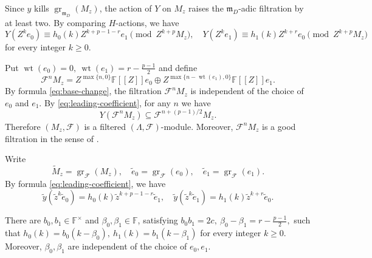 \documentclass[11pt,a4paper]{article} %
\def\FF{\mathbb{F}}
\def\cF{\mathcal{F}}
\def\gr{\operatorname{gr}}
\def\max{\operatorname{max}}
\def\wet{\operatorname{wt}}
\begin{document}
Since $y$ kills $\gr_{\mathfrak{m}_D}(M_z)$, the action of $Y$ on $M_z$ raises the $\mathfrak{m}_D$-adic filtration by at least two. By comparing $H$-actions, we have
\begin{equation}\label{eq:leading-coefficient}
Y(Z^ke_0)\equiv h_0(k)Z^{k+p-1-r}e_1\pmod{Z^{k+p}M_z},\quad Y(Z^ke_1)\equiv h_1(k)Z^{k+r}e_0\pmod{Z^{k+p}M_z}
\end{equation}
for every integer $k\ge0$.

Put $\wet(e_0)=0,~\wet(e_1)=r-\frac{p-1}{2}$ and define
\[
 \cF^nM_z=Z^{\max\{n,0\}}\FF[[Z]]e_0\oplus Z^{\max\{n-\wet(e_1),0\}}\FF[[Z]]e_1.
\]
By formula \eqref{eq:base-change}, the filtration $\cF^nM_z$ is independent of the choice of $e_0$ and $e_1$. By \eqref{eq:leading-coefficient}, for any $n$ we have
\[
Y(\cF^nM_z)\subseteq\cF^{n+(p-1)/2}M_z.
\]
Therefore $(M_z,\cF)$ is a filtered $(\Lambda,\cF)$-module. Moreover, $\cF^nM_z$ is a good filtration in the sense of \cite[\S I.5]{LvO96}.

Write 
\[
\widetilde{M}_z=\gr_{\cF}(M_z),\quad\widetilde{e}_0=\gr_{\cF}(e_0),\quad\widetilde{e}_1=\gr_{\cF}(e_1).
\]
By formula \eqref{eq:leading-coefficient}, we have
\[
\widetilde{y}(\widetilde{z}^k\widetilde{e}_0)=h_0(k)\widetilde{z}^{k+p-1-r}\widetilde{e}_1,\quad\widetilde{y}(\widetilde{z}^k\widetilde{e}_1)=h_1(k)\widetilde{z}^{k+r}\widetilde{e}_0.
\]

\begin{lemma}\label{lem:leading-linear}
    There are $b_0,b_1\in\FF^\times$ and $\beta_0,\beta_1\in\FF$, satisfying $b_0b_1=2c,~\beta_0-\beta_1=r-\frac{p-1}{2},$ such that $h_0(k)=b_0(k-\beta_0),~h_1(k)=b_1(k-\beta_1)$ for every integer $k\ge0$. Moreover, $\beta_0,\beta_1$ are independent of the choice of $e_0,e_1$.
\end{lemma}
\end{document}
